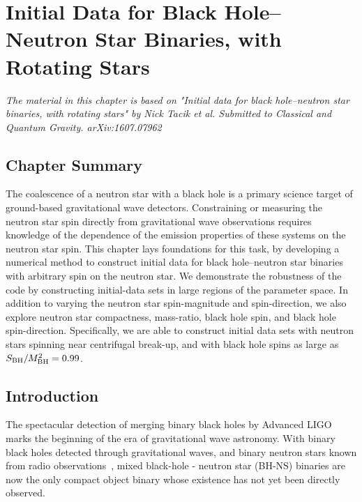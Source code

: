 \chapter[Initial Data for BH-NS Binaries, with Rotating Stars]{Initial Data for Black Hole--Neutron Star Binaries, with Rotating Stars}
\label{chap:bhns}

{\it The material in this chapter is based on "Initial data for black hole--neutron star binaries, with rotating stars" by Nick Tacik et al. Submitted to Classical and Quantum Gravity. arXiv:1607.07962}

\section{Chapter Summary}
  The coalescence of a neutron star with a black hole is a primary
  science target of ground-based gravitational wave detectors.
  Constraining or measuring the neutron star spin directly from
  gravitational wave observations requires knowledge of the dependence of
  the emission properties of these systems on the neutron star spin.
  This chapter lays foundations for this task, by developing a numerical
  method to construct initial data for black hole--neutron star
  binaries with arbitrary spin on the neutron star. We demonstrate
  the robustness of the code by constructing initial-data sets in
  large regions of the parameter space. In addition to varying the
  neutron star spin-magnitude and spin-direction, we also explore
  neutron star compactness, mass-ratio, black hole spin, and black
  hole spin-direction. Specifically, we are able to construct initial
  data sets with neutron stars spinning near centrifugal break-up, and
  with black hole spins as large as $S_{\rm BH}/M_{\rm BH}^2=0.99$.





\section{Introduction}
\label{sec:Introduction}


The spectacular detection of merging binary black holes by Advanced
LIGO~\citep{Abbott:2016nmj,LIGOVirgo2016a} marks the beginning of the
era of gravitational wave astronomy. With binary black holes detected
through gravitational waves, and binary neutron stars known from radio
observations~\citep{Hulse:1975uf}, mixed black-hole - neutron star
(BH-NS) binaries are now the only compact object binary whose
existence has not yet been directly observed.

